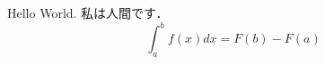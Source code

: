 \documentclass{jsarticle}
\begin{document}
Hello World.
私は人間です．
\begin{equation}
	\int_{a}^{b} f(x) dx = F(b) - F(a)
\end{equation}
\end{document}
